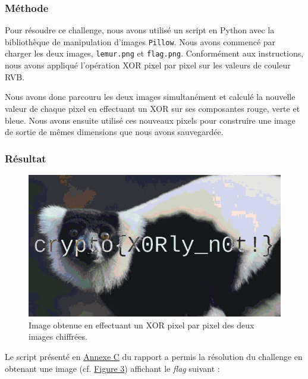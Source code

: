 \subsubsection{Méthode}
Pour résoudre ce challenge, nous avons utilisé un script en Python avec la
bibliothèque de manipulation d'images \texttt{Pillow}. Nous avons commencé
par charger les deux images, \texttt{lemur.png} et \texttt{flag.png}.
Conformément aux instructions, nous avons appliqué l'opération XOR pixel
par pixel sur les valeurs de couleur RVB.

Nous avons donc parcouru les deux images simultanément et calculé la
nouvelle valeur de chaque pixel en effectuant un XOR sur ses composantes
rouge, verte et bleue. Nous avons ensuite utilisé ces nouveaux pixels
pour construire une image de sortie de mêmes dimensions que nous avons
sauvegardée.

\subsubsection{Résultat}

\begin{figure}[H]
    \centering
    \includegraphics[width=0.8\linewidth]{Images/Lemur/xored_result.png}

    \caption{Image obtenue en effectuant un XOR pixel par pixel des deux images chiffrées.}

    \label{fig:lemurChallRes}
\end{figure}

Le script présenté en \hyperref[annexe:script-lemur]{Annexe C} du rapport a permis la résolution du challenge en obtenant
 une image (cf. \hyperref[fig:lemurChallRes]{Figure 3}) affichant le \textit{flag} suivant :

